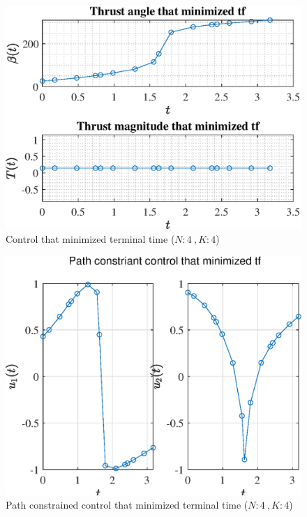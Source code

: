 \documentclass[]{article}
\begin{document}
	\begin{figure}
		\centering
		\includegraphics[scale=0.75]{control_N4_K4_C3_tf.eps}
		\caption{Control that minimized terminal time (\(N:4\ , K:4\))}
		\label{fig:control_N4_K4_C3_tf}
	\end{figure}
	\begin{figure}
		\centering
		\includegraphics[scale=0.75]{path_N4_K4_C3_tf.eps}
		\caption{Path constrained control that minimized terminal time (\(N:4\ , K:4\))}
		\label{fig:path_N4_K4_C3_tf}
	\end{figure}
\end{document}
